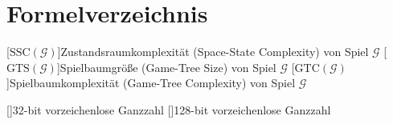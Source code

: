 \chapter*{Formelverzeichnis}

\DeclareSIUnit{}

\newcommand{\acrounit}[1]{
    \acroextra{\makebox[13mm][l]{\si[per-mode=fraction,fraction-function=\sfrac]{#1}}}
}
\def\acrospace{\acroextra{\makebox[14.375mm][l]{}}}


\begin{acronym}[WYSISWG] %


    [\ensuremath{\text{SSC}(\mathcal{G})}]{Zustandsraumkomplexität (Space-State Complexity) von Spiel $\mathcal{G}$}
    [\ensuremath{\text{GTS}(\mathcal{G})}]{Spielbaumgröße (Game-Tree Size) von Spiel $\mathcal{G}$}
    [\ensuremath{\text{GTC}(\mathcal{G})}]{Spielbaumkomplexität (Game-Tree Complexity) von Spiel $\mathcal{G}$}

    \vspace{1.2cm}

    []{32-bit vorzeichenlose Ganzzahl}
    []{128-bit vorzeichenlose Ganzzahl}






\end{acronym}
